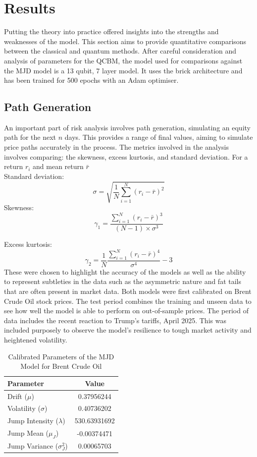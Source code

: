 \documentclass[12pt]{article}
\numberwithin{equation}{section}
\begin{document}
\newpage
\section{Results}
Putting the theory into practice offered insights into the strengths and weaknesses 
of the model. This section aims to provide quantitative comparisons between the 
classical and quantum methods. After careful consideration and analysis of parameters 
for the QCBM, the model used for comparisons against the MJD model is a 13 qubit,
7 layer model. It uses the brick architecture and has been trained for 500 epochs 
with an Adam optimiser. 
\subsection{Path Generation}
An important part of risk analysis involves path generation, simulating an equity 
path for the next $n$ days. This provides a range of final values, aiming to 
simulate price paths accurately in the process. The metrics involved in the analysis 
involves comparing: the skewness, excess kurtosis, and standard deviation. 
For a return $r_i$ and mean return $\bar{r}$ 
\\Standard deviation:
$$
\sigma = \sqrt{\frac{1}{N} \sum_{i=1}^{N} (r_i - \bar{r})^2}
$$
Skewness:
$$
\gamma_1 = \frac{\sum_{i=1}^{N} (r_i - \bar{r})^3}{(N-1) \times \sigma^3}
$$

Excess kurtosis:
$$
\gamma_2 = \frac{1}{N}\frac{\sum_{i=1}^{N} (r_i - \bar{r})^4}{\sigma^4} - 3
$$
These 
were chosen to highlight the accuracy of the models as well as the ability to represent 
subtleties in the data such as the asymmetric nature and fat tails that are often 
present in market data. Both models were first calibrated on Brent Crude Oil stock 
prices. The test period combines the training and unseen data to see how well the 
model is able to perform on out-of-sample prices. The period of data includes the 
recent reaction to Trump's tariffs, April 2025. This was included purposely to observe 
the model's resilience to tough market activity and heightened volatility.
\begin{table}[h!]
\centering
\begin{tabular}{|l|c|}
\hline
\textbf{Parameter} & \textbf{Value} \\
\hline
Drift ($\mu$) & 0.37956244 \\
Volatility ($\sigma$) & 0.40736202 \\
Jump Intensity ($\lambda$) & 530.63931692 \\
Jump Mean ($\mu_J$) & -0.00374471 \\
Jump Variance ($\sigma_J^2$) & 0.00065703 \\
\hline
\end{tabular}
\caption{Calibrated Parameters of the MJD Model for Brent Crude Oil}
\label{tab:mjd_params}
\end{table}
\end{document}

